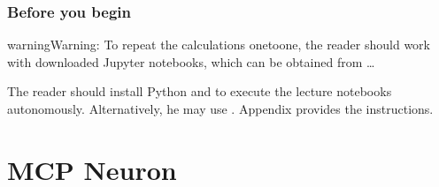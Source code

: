 \documentclass[letterpaper,10pt,english]{jupyterBook}
\begin{document}
\subsection{Before you begin}
\label{\detokenize{docs/intro:before-you-begin}}
\begin{sphinxadmonition}{warning}{Warning:}
\sphinxAtStartPar
To repeat the calculations one\sphinxhyphen{}to\sphinxhyphen{}one, the reader should work with downloaded Jupyter notebooks, which can be obtained from …

\sphinxAtStartPar
The reader should install Python and 
to execute the lecture notebooks autonomously. Alternatively, he may use . Appendix {\hyperref[\detokenize{docs/appendix:app-run}]{}} provides the instructions.
\end{sphinxadmonition}


\chapter{MCP Neuron}
\label{\detokenize{docs/mcp:mcp-neuron}}\label{\detokenize{docs/mcp:mcp-lab}}\label{\detokenize{docs/mcp::doc}}
\end{document}
